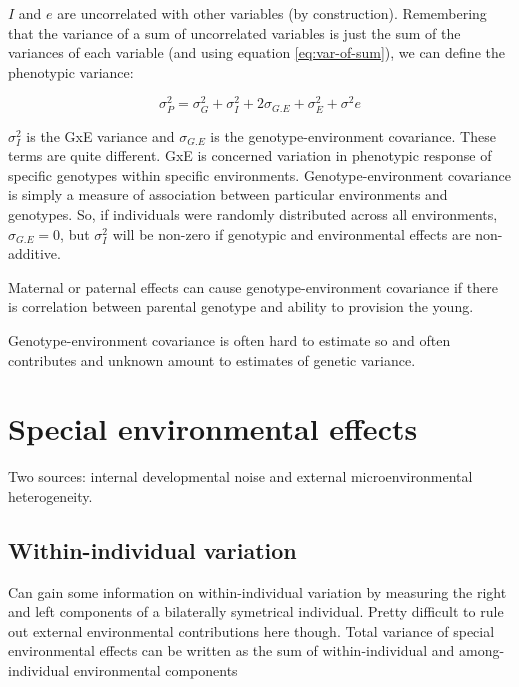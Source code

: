 \documentclass[
]{book}
\begin{document}
\(I\) and \(e\) are uncorrelated with other variables (by construction). Remembering that the variance of a sum of uncorrelated variables is just the sum of the variances of each variable (and using equation \eqref{eq:var-of-sum}), we can define the phenotypic variance:

\begin{equation}
  \sigma^2_{P} = \sigma^2_{G} + \sigma^2_{I} + 2\sigma_{G.E} + \sigma^2_{E} + \sigma^2{e}
  \label{eq:total-phenotypic-variance}
\end{equation}

\(\sigma^2_{I}\) is the GxE variance and \(\sigma_{G.E}\) is the genotype-environment covariance. These terms are quite different. GxE is concerned variation in phenotypic response of specific genotypes within specific environments. Genotype-environment covariance is simply a measure of association between particular environments and genotypes. So, if individuals were randomly distributed across all environments, \(\sigma_{G.E} = 0\), but \(\sigma^2_{I}\) will be non-zero if genotypic and environmental effects are non-additive.

Maternal or paternal effects can cause genotype-environment covariance if there is correlation between parental genotype and ability to provision the young.

Genotype-environment covariance is often hard to estimate so and often contributes and unknown amount to estimates of genetic variance.

\hypertarget{special-environmental-effects}{%
\section{Special environmental effects}\label{special-environmental-effects}}

Two sources: internal developmental noise and external microenvironmental heterogeneity.

\hypertarget{within-individual-variation}{%
\subsection{Within-individual variation}\label{within-individual-variation}}

Can gain some information on within-individual variation by measuring the right and left components of a bilaterally symetrical individual. Pretty difficult to rule out external environmental contributions here though. Total variance of special environmental effects can be written as the sum of within-individual and among-individual environmental components
\end{document}
